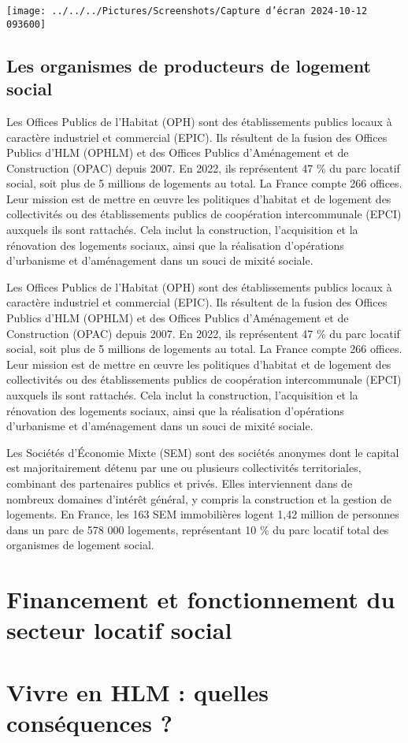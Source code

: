 \documentclass[a4paper, 12pt]{report}
\begin{document}
\begin{center}
	\texttt{[image: ../../../Pictures/Screenshots/Capture d'écran 2024-10-12 093600]}
\end{center}

\subsection{Les organismes de producteurs de logement social}

Les Offices Publics de l’Habitat (OPH) sont des établissements publics locaux à caractère industriel et commercial (EPIC). Ils résultent de la fusion des Offices Publics d’HLM (OPHLM) et des Offices Publics d’Aménagement et de Construction (OPAC) depuis 2007. En 2022, ils représentent 47 \% du parc locatif social, soit plus de 5 millions de logements au total. La France compte 266 offices. Leur mission est de mettre en œuvre les politiques d’habitat et de logement des collectivités ou des établissements publics de coopération intercommunale (EPCI) auxquels ils sont rattachés. Cela inclut la construction, l’acquisition et la rénovation des logements sociaux, ainsi que la réalisation d’opérations d’urbanisme et d’aménagement dans un souci de mixité sociale.

Les Offices Publics de l’Habitat (OPH) sont des établissements publics locaux à caractère industriel et commercial (EPIC). Ils résultent de la fusion des Offices Publics d’HLM (OPHLM) et des Offices Publics d’Aménagement et de Construction (OPAC) depuis 2007. En 2022, ils représentent 47 \% du parc locatif social, soit plus de 5 millions de logements au total. La France compte 266 offices. Leur mission est de mettre en œuvre les politiques d’habitat et de logement des collectivités ou des établissements publics de coopération intercommunale (EPCI) auxquels ils sont rattachés. Cela inclut la construction, l’acquisition et la rénovation des logements sociaux, ainsi que la réalisation d’opérations d’urbanisme et d’aménagement dans un souci de mixité sociale.

Les Sociétés d’Économie Mixte (SEM) sont des sociétés anonymes dont le capital est majoritairement détenu par une ou plusieurs collectivités territoriales, combinant des partenaires publics et privés. Elles interviennent dans de nombreux domaines d’intérêt général, y compris la construction et la gestion de logements. En France, les 163 SEM immobilières logent 1,42 million de personnes dans un parc de 578 000 logements, représentant 10 \% du parc locatif total des organismes de logement social.













\section{Financement et fonctionnement du secteur locatif social}


\section{Vivre en HLM : quelles conséquences ?}
\end{document}
